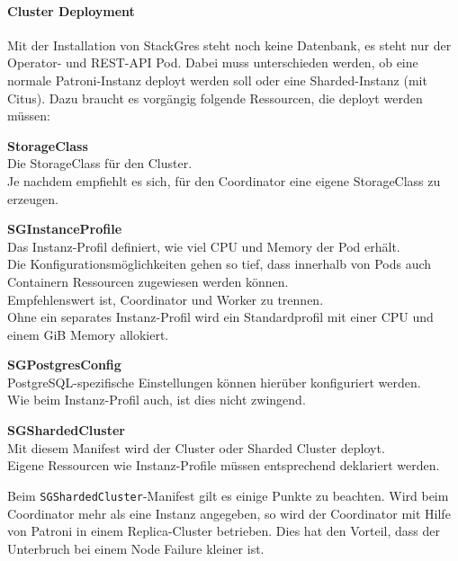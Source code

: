 \begin{flushleft}
    \paragraph{Cluster Deployment}
    Mit der Installation von StackGres steht noch keine Datenbank, es steht nur der Operator- und REST-API Pod.
    Dabei muss unterschieden werden, ob eine normale Patroni-Instanz deployt werden soll oder eine Sharded-Instanz (mit Citus).
    Dazu braucht es vorgängig folgende Ressourcen, die deployt werden müssen:
    \begin{description}
        \item \textbf{StorageClass}\hfill \\Die StorageClass für den Cluster.\\Je nachdem empfiehlt es sich, für den Coordinator eine eigene StorageClass zu erzeugen.
        \item \textbf{SGInstanceProfile}\hfill \\Das Instanz-Profil definiert, wie viel CPU und Memory der Pod erhält.\\Die Konfigurationsmöglichkeiten gehen so tief, dass innerhalb von Pods auch Containern Ressourcen zugewiesen werden können.\\Empfehlenswert ist, Coordinator und Worker zu trennen.\\Ohne ein separates Instanz-Profil wird ein Standardprofil mit einer CPU und einem GiB Memory allokiert.
        \item \textbf{SGPostgresConfig}\hfill \\PostgreSQL-spezifische Einstellungen können hierüber konfiguriert werden.\\Wie beim Instanz-Profil auch, ist dies nicht zwingend.
        \item \textbf{SGShardedCluster}\hfill \\Mit diesem Manifest wird der Cluster oder Sharded Cluster deployt.\\Eigene Ressourcen wie Instanz-Profile müssen entsprechend deklariert werden.
    \end{description}
\end{flushleft}
\begin{flushleft}
    Beim \texttt{SGShardedCluster}-Manifest gilt es einige Punkte zu beachten.
    Wird beim Coordinator mehr als eine Instanz angegeben, so wird der Coordinator mit Hilfe von Patroni in einem Replica-Cluster betrieben.
    Dies hat den Vorteil, dass der Unterbruch bei einem Node Failure kleiner ist.
\end{flushleft}
